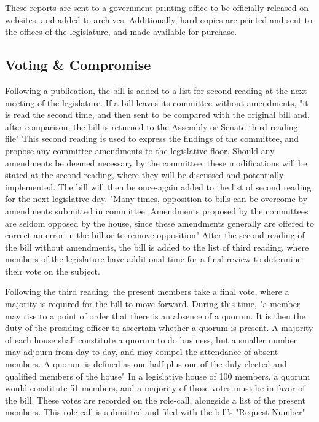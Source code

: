 \documentclass[letterpaper,twocolumn]{article}
\begin{document}
These reports are sent to a government printing office to be officially released on websites, and added to archives.  Additionally, hard-copies are printed and sent to the offices of the legislature, and made available for purchase. \cite{Legislative_Process}  

\subsection*{Voting \& Compromise}
Following a publication, the bill is added to a list for second-reading at the next meeting of the legislature.  If a bill leaves its committee without amendments, "it is read the second time, and then sent to be compared with the original bill and, after comparison, the bill is returned to the Assembly or Senate third reading file" \cite{Legislative_Process}  This second reading is used to express the findings of the committee, and propose any committee amendments to the legislative floor.  Should any amendments be deemed necessary by the committee, these modifications will be stated at the second reading, where they will be discussed and potentially implemented.  The bill will then be once-again added to the list of second reading for the next legislative day.  "Many times, opposition to bills can be overcome by amendments submitted in committee. Amendments proposed by the committees are seldom opposed by the house, since these amendments generally are offered to correct an error in the bill or to remove opposition" \cite{Legislative_Process}  After the second reading of the bill without amendments, the bill is added to the list of third reading, where members of the legislature have additional time for a final review to determine their vote on the subject.

Following the third reading, the present members take a final vote, where a majority is required for the bill to move forward.  During this time, "a member may rise to a point of order that there is an absence of a quorum. It is then the duty of the presiding officer to ascertain whether a quorum is present. A majority of each house shall constitute a quorum to do business, but a smaller number may adjourn from day to day, and may compel the attendance of absent members. A quorum is defined as one-half plus one of the duly elected and qualified members of the house" \cite{Legislative_Process}  In a legislative house of 100 members, a quorum would constitute 51 members, and a majority of those votes must be in favor of the bill.  These votes are recorded on the role-call, alongside a list of the present members.  This role call is submitted and filed with the bill's "Request Number"
\end{document}
